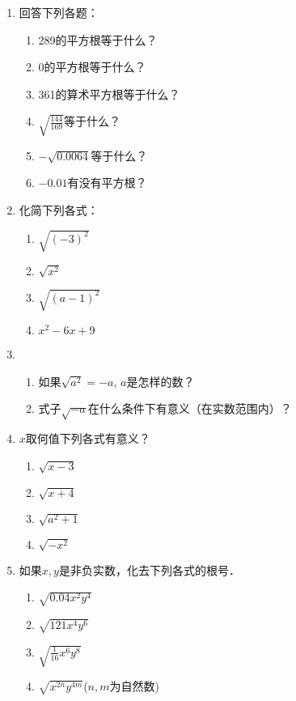\begin{ex}
\begin{enumerate}
    \item 回答下列各题：
    \begin{enumerate}
    \item 289的平方根等于什么？
    \item 0的平方根等于什么？
    \item 361的算术平方根等于什么？
    \item $\sqrt{\frac{144}{169}}$等于什么？
    \item $-\sqrt{0.0064}$等于什么？
    \item $-0.01$有没有平方根？
\end{enumerate}



\item 化简下列各式：
\begin{multicols}{2}
    \begin{enumerate}
    \item $\sqrt{(-3)^2}$
    \item $\sqrt{x^2}$
    \item $\sqrt{(a-1)^2}$
    \item $x^2-6x+9$
\end{enumerate}
\end{multicols}



\item 
\begin{enumerate}
    \item 如果$\sqrt{a^2}=-a$, $a$是怎样的数？
    \item 式子$\sqrt{-a}$在什么条件下有意义（在实数范围内）？
\end{enumerate}


\item $x$取何值下列各式有意义？
\begin{multicols}{2}
  \begin{enumerate}
    \item $\sqrt{x-3}$
    \item $\sqrt{x+4}$
    \item $\sqrt{a^2+1}$
    \item $\sqrt{-x^2}$
\end{enumerate}  
\end{multicols}


\item 如果$x,y$是非负实数，化去下列各式的根号．
\begin{enumerate}
    \item $\sqrt{0.04x^2y^4}$
    \item $\sqrt{121x^4y^6}$
    \item $\sqrt{\frac{1}{16}x^6y^8}$
    \item $\sqrt{x^{2n}y^{4m}}$\quad ($n,m$为自然数)
\end{enumerate}
\end{enumerate}
\end{ex}


